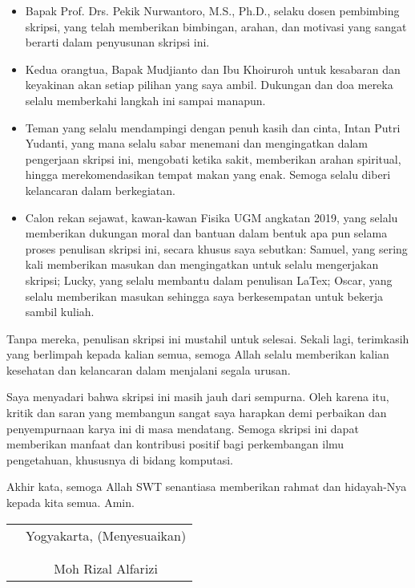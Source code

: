 \documentclass{skripsiactugm}
\begin{document}
\begin{itemize}
	\item Bapak Prof. Drs. Pekik Nurwantoro, M.S., Ph.D., selaku dosen pembimbing skripsi, yang telah memberikan bimbingan, arahan, dan motivasi yang sangat berarti dalam penyusunan skripsi ini.
	\item Kedua orangtua, Bapak Mudjianto dan Ibu Khoiruroh untuk kesabaran dan keyakinan akan setiap pilihan yang saya ambil.
	      Dukungan dan doa mereka selalu memberkahi langkah ini sampai manapun.
	\item Teman yang selalu mendampingi dengan penuh kasih dan cinta, Intan Putri Yudanti, yang mana selalu sabar menemani dan mengingatkan dalam pengerjaan skripsi ini, mengobati ketika sakit, memberikan arahan spiritual, hingga merekomendasikan tempat makan yang enak. Semoga selalu diberi kelancaran dalam berkegiatan.
	\item Calon rekan sejawat, kawan-kawan Fisika UGM angkatan 2019, yang selalu memberikan dukungan moral dan bantuan dalam bentuk apa pun selama proses penulisan skripsi ini, secara khusus saya sebutkan: Samuel, yang sering kali memberikan masukan dan mengingatkan untuk selalu mengerjakan skripsi; Lucky, yang selalu membantu dalam penulisan LaTex; Oscar, yang selalu memberikan masukan sehingga saya berkesempatan untuk bekerja sambil kuliah.
\end{itemize}

\noindent
Tanpa mereka, penulisan skripsi ini mustahil untuk selesai. Sekali lagi, terimkasih yang berlimpah kepada kalian semua, semoga Allah selalu memberikan kalian kesehatan dan kelancaran dalam menjalani segala urusan.

Saya menyadari bahwa skripsi ini masih jauh dari sempurna. Oleh karena itu, kritik dan saran yang membangun sangat saya harapkan demi perbaikan dan penyempurnaan karya ini di masa mendatang. Semoga skripsi ini dapat memberikan manfaat dan kontribusi positif bagi perkembangan ilmu pengetahuan, khususnya di bidang komputasi.

Akhir kata, semoga Allah SWT senantiasa memberikan rahmat dan hidayah-Nya kepada kita semua. Amin.

\vspace{0.8cm}

\begin{tabular}{p{7cm}c}
	 & Yogyakarta, (Menyesuaikan) \\
	 &                            \\
	 &                            \\
	 & Moh Rizal Alfarizi
\end{tabular}
\end{document}
